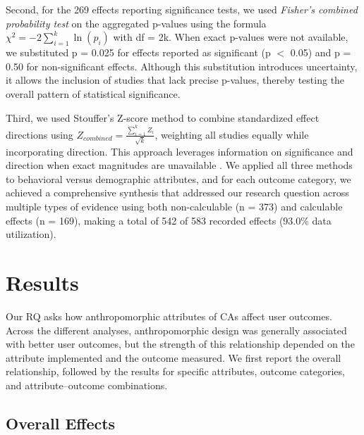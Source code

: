 \documentclass[preprint,review,12pt,authoryear,nonatbib]{elsarticle}
\begin{document}
Second, for the 269 effects reporting significance tests, we used \textit{Fisher's combined probability test} \parencite{fisher1932statistical} on the aggregated p-values using the formula $\chi^2 = -2\sum_{i=1}^{k} \ln(p_i)$ with df = 2k. When exact p-values were not available, we substituted p = 0.025 for effects reported as significant (p $<$ 0.05) and p = 0.50 for non-significant effects. Although this substitution introduces uncertainty, it allows the inclusion of studies that lack precise p-values, thereby testing the overall pattern of statistical significance. %

Third, we used Stouffer's Z-score method \parencite{whitlock2005combining} to combine standardized effect directions using $Z_{combined} = \frac{\sum_{i=1}^{k} Z_i}{\sqrt{k}}$, weighting all studies equally while incorporating direction. This approach leverages information on significance and direction when exact magnitudes are unavailable \parencite{whitlock2005combining}.
We applied all three methods to behavioral versus demographic attributes, and for each outcome category, we achieved a comprehensive synthesis that addressed our research question across multiple types of evidence using both  %
non-calculable (n = 373) and calculable effects (n = 169), making a total of 542 of 583 recorded effects (93.0\% data utilization). 

\section{Results}

Our RQ asks how anthropomorphic attributes of CAs affect user outcomes. Across the different analyses, anthropomorphic design was generally associated with better user outcomes, but the strength of this relationship depended on the attribute implemented and the outcome measured. We first report the overall relationship, followed by the results for specific attributes, outcome categories, and attribute--outcome combinations.

\subsection{Overall Effects}
\end{document}
